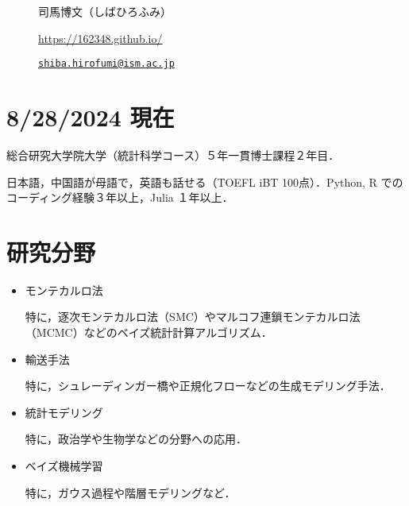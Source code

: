 \documentclass[
  11pt,
]{article}
\date{}
\begin{document}
\begin{figure}

\begin{minipage}{0.50\linewidth}
\Huge 司馬博文（しばひろふみ）\end{minipage}%
%
\begin{minipage}{0.50\linewidth}

\color{minty}

\hfill {} \url{https://162348.github.io/}

\par

\hfill {}
\href{mailto:shiba.hirofumi@ism.ac.jp}{\nolinkurl{shiba.hirofumi@ism.ac.jp}}

\par

\end{minipage}%

\end{figure}%

\vspace{-1em}

\section{8/28/2024 現在}\label{ux73feux5728}

総合研究大学院大学（統計科学コース）５年一貫博士課程２年目．

日本語，中国語が母語で，英語も話せる（TOEFL iBT 100点）．Python, R
でのコーディング経験３年以上，Julia １年以上．

\section{研究分野}\label{ux7814ux7a76ux5206ux91ce}

\begin{itemize}
\item
  モンテカルロ法

  特に，逐次モンテカルロ法（SMC）やマルコフ連鎖モンテカルロ法（MCMC）などのベイズ統計計算アルゴリズム．
\item
  輸送手法

  特に，シュレーディンガー橋や正規化フローなどの生成モデリング手法．
\item
  統計モデリング

  特に，政治学や生物学などの分野への応用．
\item
  ベイズ機械学習

  特に，ガウス過程や階層モデリングなど．
\end{itemize}
\end{document}
